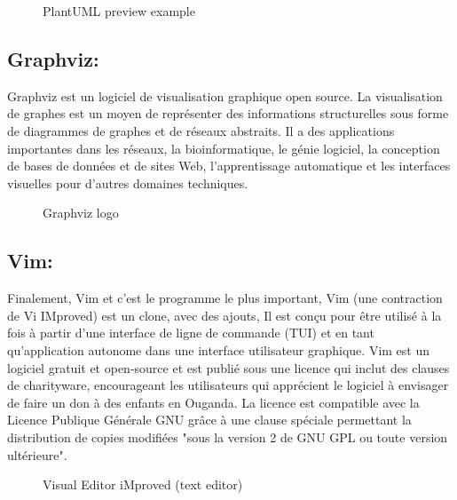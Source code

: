 \documentclass[12pt]{report}
\begin{document}
\begin{figure}[h]
\centering
    \caption{PlantUML preview example}
\end{figure}

\vspace{-0.2in}
\subsection{Graphviz:}
Graphviz est un logiciel de visualisation graphique open source. La visualisation de graphes est un moyen de représenter des informations structurelles sous forme de diagrammes de graphes et de réseaux abstraits. Il a des applications importantes dans les réseaux, la bioinformatique, le génie logiciel, la conception de bases de données et de sites Web, l'apprentissage automatique et les interfaces visuelles pour d'autres domaines techniques.

\begin{figure}[h]
\centering
    \caption{Graphviz logo}
\end{figure}

\newpage

\subsection{Vim:}
Finalement, Vim et c'est le programme le plus important, Vim (une contraction de Vi IMproved) est un clone, avec des ajouts, Il est conçu pour être utilisé à la fois à partir d'une interface de ligne de commande (TUI) et en tant qu'application autonome dans une interface utilisateur graphique. Vim est un logiciel gratuit et open-source et est publié sous une licence qui inclut des clauses de charityware, encourageant les utilisateurs qui apprécient le logiciel à envisager de faire un don à des enfants en Ouganda. La licence est compatible avec la Licence Publique Générale GNU grâce à une clause spéciale permettant la distribution de copies modifiées "sous la version 2 de GNU GPL ou toute version ultérieure".

\begin{figure}[h]
\centering
    \caption{Visual Editor iMproved (text editor)}
\end{figure}
\end{document}
